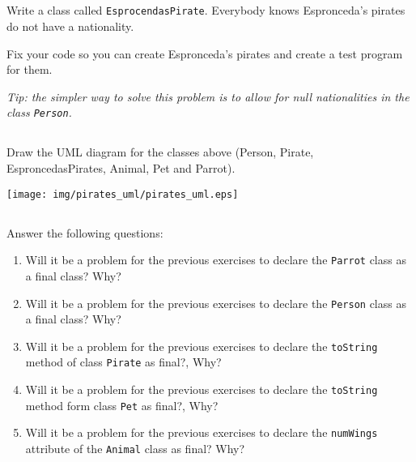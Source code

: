 \documentclass[a4paper, 11pt]{article}
\begin{document}
\subsection{}

Write a class called \verb+EsprocendasPirate+. Everybody knows Espronceda's
pirates do not have a nationality.

Fix your code so you can create Espronceda's pirates and create a test program
for them.


\textsl{Tip: the simpler way to solve this problem is to allow for null
nationalities in the class \texttt{Person}.}









\subsection{}

Draw the UML diagram for the classes above (Person, Pirate, EsproncedasPirates,
Animal, Pet and Parrot).

\begin{solution}
  \centering
    \texttt{[image: img/pirates\_uml/pirates\_uml.eps]}
\end{solution}







\subsection{}

Answer the following questions:

\begin{enumerate}

  \item Will it be a problem for the previous exercises to declare the
    \verb+Parrot+ class as a final class? Why?

  \item Will it be a problem for the previous exercises to declare the
    \verb+Person+ class as a final class? Why?

  \item Will it be a problem for the previous exercises to declare the
    \verb+toString+ method of class \verb+Pirate+ as final?, Why?

  \item Will it be a problem for the previous exercises to declare the
    \verb+toString+ method form class \verb+Pet+ as final?, Why?

  \item Will it be a problem for the previous exercises to declare the
    \verb+numWings+ attribute of the \verb+Animal+ class as final? Why?

\end{enumerate}
\end{document}

